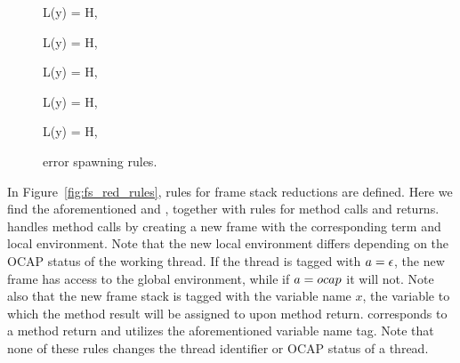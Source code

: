 \begin{figure}
  {L(y) = \NullVal}
  {H,  \; \FRedTo \; \Error}

  \RuleSpace{}

  {L(y) = \NullVal}
  {H,  \; \FRedTo \; \Error}

  \RuleSpace{}

  {L(y) = \NullVal}
  {H,  \; \FRedTo \; \Error}

  \RuleSpace{}

  {L(y) = \NullVal}
  {H,  \; \FRedTo \; \Error}

  \RuleSpace{}

  {L(y) = \NullVal}
  {H,   \\ \FRedTo \; \Error}
  \caption{\RACL{} error spawning rules.}
  \label{fig:error_red_rules}
\end{figure}

In Figure~\ref{fig:fs_red_rules}, rules for frame stack reductions are defined.
Here we find the aforementioned \EFProp{} and \EErrorFS{}, together with rules
for method calls and returns. \ECall{} handles method calls by creating a new
frame with the corresponding term and local environment. Note that the new local
environment differs depending on the OCAP status of the working thread. If the
thread is tagged with $a = \mbox{$\epsilon$}$, the new frame has access to the global
environment, while if $a = \mbox{$ocap$}$ it will not. Note also that the new frame
stack is tagged with the variable name $x$, the variable to which the method
result will be assigned to upon method return. \ERet{} corresponds to a method
return and utilizes the aforementioned variable name tag. Note that none of
these rules changes the thread identifier or OCAP status of a thread.

